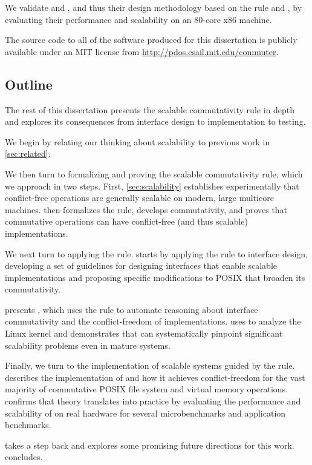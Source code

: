 \noindent
We validate \vm and \fs, and thus their design methodology based on
the rule and \tool, by evaluating their performance and scalability on
an 80-core x86 machine.

The source code to all of the software produced for this dissertation
is publicly available under an MIT license from
\url{http://pdos.csail.mit.edu/commuter}.


\subsection{Outline}

The rest of this dissertation presents the scalable commutativity rule
in depth and explores its consequences from interface design to
implementation to testing.

We begin by relating our thinking about scalability to previous work
in \cref{sec:related}.

We then turn to formalizing and proving the scalable commutativity
rule, which we approach in two steps.  First, \cref{sec:scalability}
establishes experimentally that conflict-free operations are generally
scalable on modern, large multicore machines.   then
formalizes the rule, develops \SIM commutativity, and proves that
commutative operations can have conflict-free (and thus scalable)
implementations.

We next turn to applying the rule.   starts by
applying the rule to interface design, developing a set of guidelines
for designing interfaces that enable scalable implementations and
proposing specific modifications to POSIX that broaden its
commutativity.

 presents \tool, which uses the rule to automate
reasoning about interface commutativity and the conflict-freedom of
implementations.   uses \tool to analyze the Linux
kernel and demonstrates that \tool can systematically pinpoint
significant scalability problems even in mature systems.

Finally, we turn to the implementation of scalable systems guided by
the rule.   describes the implementation of \sys and how
it achieves conflict-freedom for the vast majority of commutative
POSIX file system and virtual memory operations.  
confirms that theory translates into practice by evaluating the
performance and scalability of \sys on real hardware for several
microbenchmarks and application benchmarks.

 takes a step back and explores some promising
future directions for this work.   concludes.

